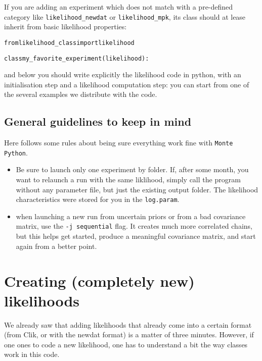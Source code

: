 \documentclass[10pt]{article}
\newcommand{\MP}{\texttt{Monte Python}}
\begin{document}
  If you are adding an experiment which does not match with a pre-defined category like \verb?likelihood_newdat? or \verb?likelihood_mpk?, its class should at lease inherit from basic likelihood properties:
    \begin{alltt}
  from likelihood_class import likelihood

  class my_favorite_experiment(likelihood):
    
  \end{alltt}

  and below you should write explicitly the likelihood code in python, with an initialisation step and a likelihood computation step: you can start from one of the several examples we distribute with the code.
  

  \subsection{General guidelines to keep in mind}

  Here follows some rules about being sure everything work fine with \MP.
\begin{itemize}
  \item Be sure to launch only one experiment by folder. If, after some month,
    you want to relaunch a run with the same liklihood, simply call the program without any
    parameter file, but just the existing output folder. The likelihood characteristics were stored for you in the \verb?log.param?.
  \item when launching a new run from uncertain priors or from a bad covariance matrix,
    use the \verb?-j sequential? flag. It creates much more correlated chains,
    but this helps get started, produce a meaningful covariance matrix, and
    start again from a better point.
\end{itemize}
\newpage
\section{Creating (completely new) likelihoods}

  We already saw that adding likelihoods that already come into a certain format
  (from Clik, or with the newdat format) is a matter of three minutes. However,
  if one ones to code a new likelihood, one has to understand a bit the way
  classes work in this code.\\
\end{document}

